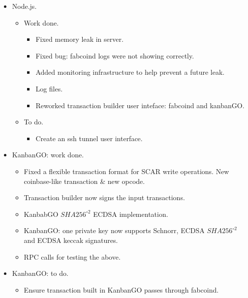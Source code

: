 \begin{frame}
\begin{itemize}
\item Node.js. 
\begin{itemize}
\item Work done.
\begin{itemize}
\item Fixed memory leak in server.
\item Fixed bug: fabcoind logs were not showing correctly.
\item Added monitoring infrastructure to help prevent a future leak.
\item Log files.
\item Reworked transaction builder user inteface: fabcoind and kanbanGO.
\end{itemize}
\item To do.
\begin{itemize}
\item Create an ssh tunnel user interface.
\end{itemize}
\end{itemize}
\item KanbanGO: work done.
\begin{itemize}
\item Fixed a flexible transaction format for SCAR write operations. New coinbase-like transaction \& new opcode.
\item Transaction builder now signs the input transactions.
\item KanbabGO $SHA256^{\circ 2}$ ECDSA implementation. 
\item KanbanGO: one private key now supports Schnorr, ECDSA $SHA256^{\circ 2}$ and ECDSA keccak signatures.
\item RPC calls for testing the above.
\end{itemize}
\item KanbanGO: to do.
\begin{itemize}
\item Ensure transaction built in KanbanGO passes through fabcoind.
\end{itemize}
\end{itemize}
\end{frame}

